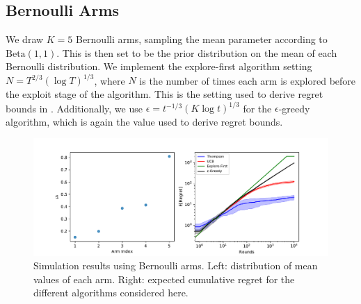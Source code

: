 \documentclass[a4paper]{article}
\begin{document}
	\subsection{Bernoulli Arms}
	We draw $K=5$ Bernoulli arms, sampling the mean parameter according to $\text{Beta}(1, 1)$. This is then set to be the prior distribution on the mean of each Bernoulli distribution. We implement the explore-first algorithm setting $N = T^{2/3} (\log T)^{1/3}$, where $N$ is the number of times each arm is explored before the exploit stage of the algorithm. This is the setting used to derive regret bounds in \cite{book}. Additionally,  we use $\epsilon = t^{-1/3} (K \log t)^{1/3}$ for the $\epsilon$-greedy algorithm, which is again the value used to derive regret bounds. 
	\begin{figure}[H]
		\includegraphics[width=\textwidth]{bernoulli}
		\centering
		\caption{\label{bernoulli}Simulation results using Bernoulli arms. Left: distribution of mean values of each arm. Right: expected cumulative regret for the different algorithms considered here. }
	\end{figure}
\end{document}

